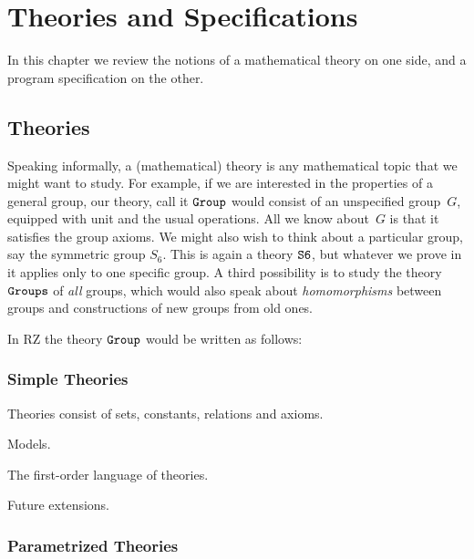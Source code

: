 \chapter{Theories and Specifications}
\label{cha:theor-spec}

In this chapter we review the notions of a mathematical theory on one
side, and a program specification on the other.

\section{Theories}
\label{sec:theories}

Speaking informally, a (mathematical) theory is any mathematical topic
that we might want to study. For example, if we are interested in the
properties of a general group, our theory, call it $\mathtt{Group}$ would
consist of an unspecified group~$G$, equipped with unit and the usual
operations. All we know about~$G$ is that it satisfies the group
axioms. We might also wish to think about a particular group, say the
symmetric group $S_6$. This is again a theory $\mathtt{S6}$, but whatever
we prove in it applies only to one specific group. A third possibility
is to study the theory $\mathtt{Groups}$ of \emph{all} groups, which
would also speak about \emph{homomorphisms} between groups and
constructions of new groups from old ones.

\vspace{2cm}

In RZ the theory $\mathtt{Group}$ would be written as follows:
%

\subsection{Simple Theories}
\label{sec:simple-theories}

Theories consist of sets, constants, relations and axioms.

Models.

The first-order language of theories.

Future extensions.

\subsection{Parametrized Theories}
\label{sec:param-theor}

